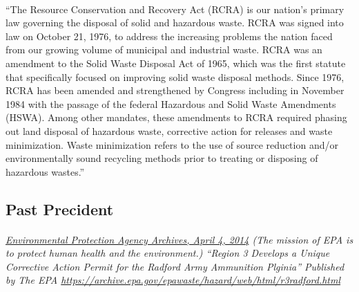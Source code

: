 \documentclass{article}
\begin{document}
\paragraph{}
``The Resource Conservation and Recovery Act (RCRA) is our nation’s primary law governing the disposal of solid and hazardous waste. RCRA was signed into law on October 21, 1976, to address the increasing problems the nation faced from our growing volume of municipal and industrial waste. RCRA was an amendment to the Solid Waste Disposal Act of 1965, which was the first statute that specifically focused on improving solid waste disposal methods.
Since 1976, RCRA has been amended and strengthened by Congress including in November 1984 with the passage of the federal Hazardous and Solid Waste Amendments (HSWA). Among other mandates, these amendments to RCRA required phasing out land disposal of hazardous waste, corrective action for releases and waste minimization. Waste minimization refers to the use of source reduction and/or environmentally sound recycling methods prior to treating or disposing of hazardous wastes.”

\subsection{Past Precident}
\paragraph{}
\small
\textit{
\underline{Environmental Protection Agency Archives, April 4, 2014}
(The mission of EPA is to protect human health and the environment.) “Region 3 Develops a Unique Corrective Action Permit for the Radford Army Ammunition Plginia” Published by The EPA   
\url{https://archive.epa.gov/epawaste/hazard/web/html/r3radford.html}}
\normalsize
\end{document}
